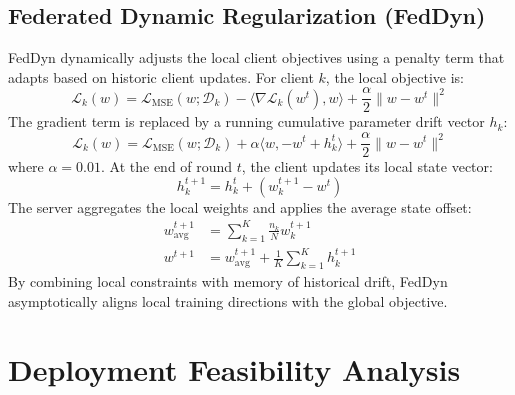 \subsection{Federated Dynamic Regularization (FedDyn)}
FedDyn dynamically adjusts the local client objectives using a penalty term that adapts based on historic client updates. For client $k$, the local objective is:
\begin{equation}
    \mathcal{L}_k(w) = \mathcal{L}_{\text{MSE}}(w; \mathcal{D}_k) - \langle \nabla \mathcal{L}_k(w^t), w \rangle + \frac{\alpha}{2} \|w - w^t\|^2
\end{equation}
The gradient term is replaced by a running cumulative parameter drift vector $h_k$:
\begin{equation}
    \mathcal{L}_k(w) = \mathcal{L}_{\text{MSE}}(w; \mathcal{D}_k) + \alpha \langle w, -w^t + h_k^t \rangle + \frac{\alpha}{2} \|w - w^t\|^2
\end{equation}
where $\alpha = 0.01$. At the end of round $t$, the client updates its local state vector:
\begin{equation}
    h_k^{t+1} = h_k^t + (w_k^{t+1} - w^t)
\end{equation}
The server aggregates the local weights and applies the average state offset:
\begin{align}
    w_{\text{avg}}^{t+1} &= \sum_{k=1}^K \frac{n_k}{N} w_k^{t+1} \\
    w^{t+1} &= w_{\text{avg}}^{t+1} + \frac{1}{K}\sum_{k=1}^K h_k^{t+1}
\end{align}
By combining local constraints with memory of historical drift, FedDyn asymptotically aligns local training directions with the global objective.

\section{Deployment Feasibility Analysis}
\label{sec:deployment-feasibility}

